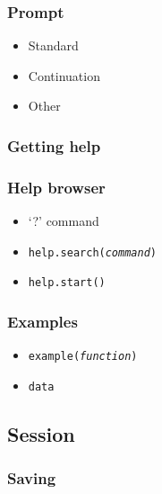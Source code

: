 \documentclass[10pt,letterpaper]{article}
\begin{document}

\subsubsection{Prompt} %
\label{ssub:prompt}
\begin{itemize}
    \item Standard
    \item Continuation
    \item Other
\end{itemize}



\subsubsection{Getting help}

\subsubsection{Help browser} %
\label{ssub:help_browser}
\begin{itemize}
    \item `?' command
    \item \texttt{help.search(\emph{command})}
    \item \texttt{help.start()}
\end{itemize}



\subsubsection{Examples} %
\label{ssub:examples}

\begin{itemize}
    \item \texttt{example(\emph{function})}
    \item \texttt{data}
\end{itemize}


\subsection{Session} %
\label{sub:session}

\subsubsection{Saving} %
\label{ssub:saving}
\end{document}
